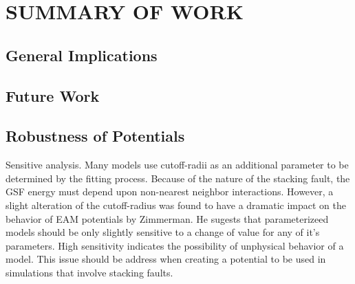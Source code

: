 \chapter{SUMMARY OF WORK}

\section{General Implications}

\section{Future Work}

\section{Robustness of Potentials}
Sensitive analysis.  Many models use cutoff-radii as an additional parameter to be determined by the fitting process.  Because of the nature of the stacking fault, the GSF energy must depend upon non-nearest neighbor interactions.
However, a slight alteration of the cutoff-radius was found to have a dramatic impact on the behavior of EAM potentials by Zimmerman.%
He sugests that parameterizeed models should be only slightly sensitive to a change of value for any of it's parameters.  High sensitivity indicates the possibility of unphysical behavior of a model.  This issue should be address when creating a potential to be used in simulations that involve stacking faults.
